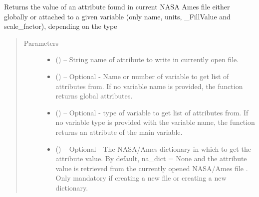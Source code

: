\documentclass[a4paper,10pt,openany,english]{sphinxmanual}
\begin{document}
\begin{fulllineitems}
\begin{fulllineitems}
\begin{quote}
\begin{description}
\begin{itemize}
\end{itemize}

\end{description}\end{quote}

\end{fulllineitems}


\begin{fulllineitems}
\label{egadsapi:egads.input.nasa_ames_io.NasaAmes.get_attribute_value}
Returns the value of an attribute found in current NASA Ames file either globally 
or attached to a given variable (only name, units, \_FillValue and scale\_factor), depending on the type
\begin{quote}\begin{description}
\item[{Parameters}] \leavevmode\begin{itemize}
\item {} 
 () -- String name of attribute to write in currently open file.

\item {} 
 () -- Optional - Name or number of variable to get list of attributes from. If no
variable name is provided, the function returns global attributes.

\item {} 
 () -- Optional - type of variable to get list of attributes from. If no
variable type is provided with the variable name, the function returns an 
attribute of the main variable.

\item {} 
 () -- Optional - The NASA/Ames dictionary in which to get the attribute value. By default, 
na\_dict = None and the attribute value is retrieved from the currently opened NASA/Ames 
file . Only mandatory if creating a new file or creating a new dictionary.

\end{itemize}

\end{description}\end{quote}


\end{fulllineitems}
\end{fulllineitems}
\end{document}
